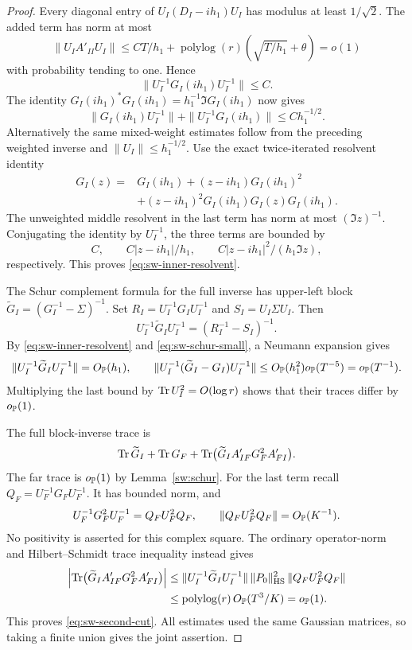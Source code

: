 \begin{proof}
Every diagonal entry of \(U_I(D_I-ih_1)U_I\) has modulus at least
\(1/\sqrt2\). The added term has norm at most
\[
 \|U_IA'_{II}U_I\|
 \le C T/h_1+\operatorname{polylog}(r)
       \left(\sqrt{T/h_1}+\theta\right)=o(1)
\]
with probability tending to one. Hence
\[
 \|U_I^{-1}G_I(ih_1)U_I^{-1}\|\le C.
\]
The identity \(G_I(ih_1)^*G_I(ih_1)=h_1^{-1}\Im G_I(ih_1)\) now gives
\[
 \|G_I(ih_1)U_I^{-1}\|+\|U_I^{-1}G_I(ih_1)\|
 \le C h_1^{-1/2}.
\]
Alternatively the same mixed-weight estimates follow from the preceding
weighted inverse and \(\|U_I\|\le h_1^{-1/2}\).
Use the exact twice-iterated resolvent identity
\begin{align*}
 G_I(z)
 ={}&G_I(ih_1)+(z-ih_1)G_I(ih_1)^2\\
 &+(z-ih_1)^2G_I(ih_1)G_I(z)G_I(ih_1).
\end{align*}
The unweighted middle resolvent in the last term has norm at most
\((\Im z)^{-1}\). Conjugating the identity by \(U_I^{-1}\), the three
terms are bounded by
\[
 C,\qquad C|z-ih_1|/h_1,\qquad
 C|z-ih_1|^2/(h_1\Im z),
\]
respectively. This proves \eqref{eq:sw-inner-resolvent}.

The Schur complement formula for the full inverse has upper-left block
\(\widetilde G_I=(G_I^{-1}-\Sigma)^{-1}\).
Set \(R_I=U_I^{-1}G_IU_I^{-1}\) and \(S_I=U_I\Sigma U_I\).
Then
\[
 U_I^{-1}\widetilde G_IU_I^{-1}
 =(R_I^{-1}-S_I)^{-1}.
\]
By \eqref{eq:sw-inner-resolvent} and
\eqref{eq:sw-schur-small}, a Neumann expansion gives
\[
 \|U_I^{-1}\widetilde G_IU_I^{-1}\|=O_{\mathbb P}(h_1),\qquad
 \|U_I^{-1}(\widetilde G_I-G_I)U_I^{-1}\|
 \le O_{\mathbb P}(h_1^2)o_{\mathbb P}(T^{-5})=o_{\mathbb P}(T^{-1}).
\]
Multiplying the last bound by \(\operatorname{Tr} U_I^2=O(\log r)\) shows that their
traces differ by \(o_{\mathbb P}(1)\).

The full block-inverse trace is
\[
 \operatorname{Tr}\widetilde G_I+\operatorname{Tr} G_F+
 \operatorname{Tr}\bigl(\widetilde G_IA'_{IF}G_F^2A'_{FI}\bigr).
\]
The far trace is \(o_{\mathbb P}(1)\) by Lemma~\ref{sw:schur}.
For the last term recall \(Q_F=U_F^{-1}G_FU_F^{-1}\).
It has bounded norm, and
\[
 U_F^{-1}G_F^2U_F^{-1}=Q_FU_F^2Q_F,\qquad
 \|Q_FU_F^2Q_F\|=O_{\mathbb P}(K^{-1}).
\]
No positivity is asserted for this complex square. The ordinary
operator-norm and Hilbert--Schmidt trace inequality instead gives
\begin{align*}
 \left|\operatorname{Tr}\bigl(\widetilde G_IA'_{IF}G_F^2A'_{FI}\bigr)\right|
 &\le
 \|U_I^{-1}\widetilde G_IU_I^{-1}\|\,
 \|P_0\|_{\mathrm{HS}}^2\,
 \|Q_FU_F^2Q_F\|\\
 &\le \operatorname{polylog}(r)\,O_{\mathbb P}(T^3/K)=o_{\mathbb P}(1).
\end{align*}
This proves \eqref{eq:sw-second-cut}. All estimates used the same Gaussian
matrices, so taking a finite union gives the joint assertion.
\end{proof}


